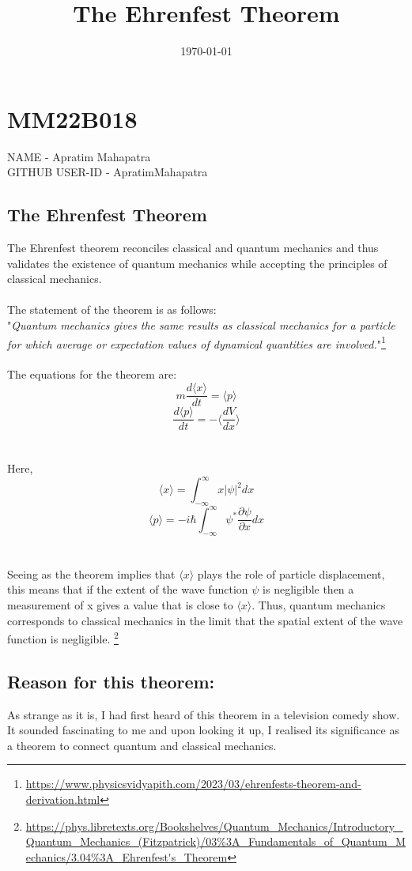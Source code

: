 \documentclass{article}
\title{\vspace{-5cm}The Ehrenfest Theorem}
\author{}
\date{\today}
\begin{document}
\maketitle



\section{MM22B018}
NAME - Apratim Mahapatra \\
GITHUB USER-ID - ApratimMahapatra

\subsection{The Ehrenfest Theorem}
The Ehrenfest theorem reconciles classical and quantum mechanics and thus validates the existence of quantum mechanics while accepting the principles of classical mechanics.\\\\
The statement of the theorem is as follows: \\
"\emph{Quantum mechanics gives the same results as classical mechanics for a particle for which average or expectation values of dynamical quantities are involved.}"\footnote{\url{https://www.physicsvidyapith.com/2023/03/ehrenfests-theorem-and-derivation.html}} \\
\\
The equations for the theorem are: \\ 
$$m \frac{d\langle x\rangle}{dt} = \langle p\rangle$$
$$\frac{d\langle p\rangle}{dt} = - \langle \frac{dV}{dx}\rangle$$
\\\\
Here, 
$$\langle x\rangle = \int ^{\infty} _{- \infty} x |\psi|^2 dx$$
$$\langle p\rangle = - i \hbar \int ^{\infty} _{- \infty} {\psi}^* \frac{\partial \psi}{\partial x} dx$$
\\\\
Seeing as the theorem implies that $\langle x\rangle$ plays the role of particle displacement, this means that if the extent of the wave function $\psi$ is negligible then a measurement of x gives a value that is close to $\langle x \rangle$. Thus, quantum mechanics corresponds to classical mechanics in the limit that the spatial extent of the wave function is negligible. \footnote{\url{https://phys.libretexts.org/Bookshelves/Quantum_Mechanics/Introductory_Quantum_Mechanics_(Fitzpatrick)/03\%3A_Fundamentals_of_Quantum_Mechanics/3.04\%3A_Ehrenfest's_Theorem}}
\subsection{Reason for this theorem:}
As strange as it is, I had first heard of this theorem in a television comedy show. It sounded fascinating to me and upon looking it up, I realised its significance as a theorem to connect quantum and classical mechanics. 
\end{document}

